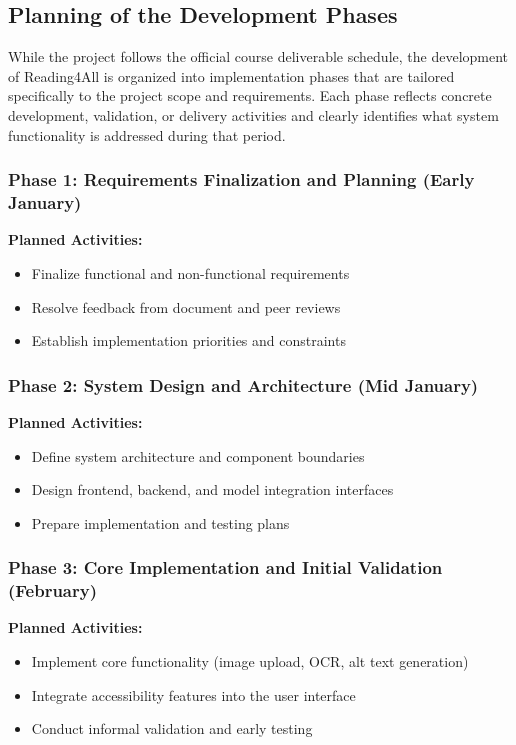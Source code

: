 \documentclass[12pt]{article}
\begin{document}
\subsection{Planning of the Development Phases}

While the project follows the official course deliverable schedule,
the development of Reading4All is organized into implementation phases
that are tailored specifically to the project scope and requirements.
Each phase reflects concrete development, validation, or delivery
activities and clearly identifies what system functionality is
addressed during that period.

\subsubsection*{Phase 1: Requirements Finalization and Planning (Early January)}
\textbf{Planned Activities:}
\begin{itemize}
  \item Finalize functional and non-functional requirements
  \item Resolve feedback from document and peer reviews
  \item Establish implementation priorities and constraints
\end{itemize}

\subsubsection*{Phase 2: System Design and Architecture (Mid January)}
\textbf{Planned Activities:}
\begin{itemize}
  \item Define system architecture and component boundaries
  \item Design frontend, backend, and model integration interfaces
  \item Prepare implementation and testing plans
\end{itemize}

\subsubsection*{Phase 3: Core Implementation and Initial Validation (February)}
\textbf{Planned Activities:}
\begin{itemize}
  \item Implement core functionality (image upload, OCR, alt text generation)
  \item Integrate accessibility features into the user interface
  \item Conduct informal validation and early testing
\end{itemize}
\end{document}
